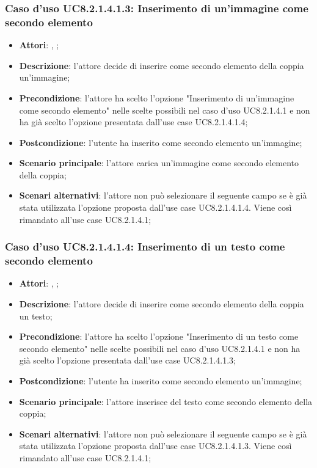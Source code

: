 		\subsubsection{Caso d'uso UC8.2.1.4.1.3: Inserimento di un'immagine come secondo elemento}
		\label{UC8.2.1.4.1.3}
		\begin{itemize}
			\item \textbf{Attori}: \uau, \uaupro;
			\item \textbf{Descrizione}: l'attore decide di inserire come secondo elemento della coppia un'immagine;
			\item \textbf{Precondizione}: l'attore ha scelto l'opzione "Inserimento di un'immagine come secondo elemento" nelle scelte possibili nel caso d'uso UC8.2.1.4.1 e non ha già scelto l'opzione presentata dall'use case UC8.2.1.4.1.4;
			\item \textbf{Postcondizione}: l'utente ha inserito come secondo elemento un'immagine;
			\item \textbf{Scenario principale}: l'attore carica un'immagine come secondo elemento della coppia;  
			\item \textbf{Scenari alternativi}: l'attore non può selezionare il seguente campo se è già stata utilizzata l'opzione proposta dall'use case UC8.2.1.4.1.4. Viene così rimandato all'use case UC8.2.1.4.1;
		\end{itemize}
		
		\subsubsection{Caso d'uso UC8.2.1.4.1.4: Inserimento di un testo come secondo elemento}
		\label{UC8.2.1.4.1.4}
		\begin{itemize}
			\item \textbf{Attori}: \uau, \uaupro;
			\item \textbf{Descrizione}: l'attore decide di inserire come secondo elemento della coppia un testo;
			\item \textbf{Precondizione}: l'attore ha scelto l'opzione "Inserimento di un testo come secondo elemento" nelle scelte possibili nel caso d'uso UC8.2.1.4.1 e non ha già scelto l'opzione presentata dall'use case UC8.2.1.4.1.3;
			\item \textbf{Postcondizione}: l'utente ha inserito come secondo elemento un'immagine;
			\item \textbf{Scenario principale}: l'attore inserisce del testo come secondo elemento della coppia;  
			\item \textbf{Scenari alternativi}: l'attore non può selezionare il seguente campo se è già stata utilizzata l'opzione proposta dall'use case UC8.2.1.4.1.3. Viene così rimandato all'use case UC8.2.1.4.1;
		\end{itemize}
	
